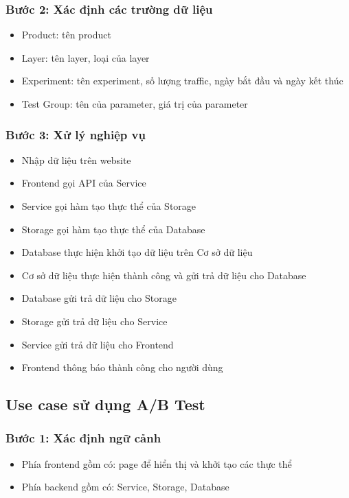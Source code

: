 \subsubsection{Bước 2: Xác định các trường dữ liệu}

\begin{itemize}
	\item Product: tên product
	\item Layer: tên layer, loại của layer
	\item Experiment: tên experiment, số lượng traffic, ngày bắt đầu và ngày kết thúc
	\item Test Group: tên của parameter, giá trị của parameter
\end{itemize}

\subsubsection{Bước 3: Xử lý nghiệp vụ}

\begin{itemize}
	\item Nhập dữ liệu trên website
	\item Frontend gọi API của Service
	\item Service gọi hàm tạo thực thể của Storage
	\item Storage gọi hàm tạo thực thể của Database
	\item Database thực hiện khởi tạo dữ liệu trên Cơ sở dữ liệu
	\item Cơ sở dữ liệu thực hiện thành công và gửi trả dữ liệu cho Database
	\item Database gửi trả dữ liệu cho Storage
	\item Storage gửi trả dữ liệu cho Service
	\item Service gửi trả dữ liệu cho Frontend
	\item Frontend thông báo thành công cho người dùng
\end{itemize}

\subsection{Use case sử dụng A/B Test}

\subsubsection{Bước 1: Xác định ngữ cảnh}

\begin{itemize}
	\item Phía frontend gồm có: page để hiển thị và khởi tạo các thực thể
	\item Phía backend gồm có: Service, Storage, Database
\end{itemize}

